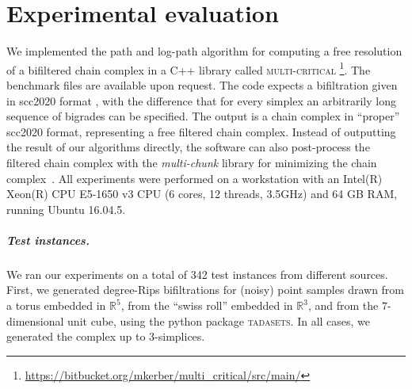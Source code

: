 \documentclass[11pt]{article}
\newcommand{\ignore}[1]{}
\newcommand{\R}{\mathbb{R}}
\begin{document}
\section{Experimental evaluation}
\label{sec:experiments}
%
We implemented the path and log-path algorithm for computing a free resolution
of a bifiltered chain complex 
in a C++ library called \textsc{multi-critical} \footnote{\url{https://bitbucket.org/mkerber/multi_critical/src/main/}}. The benchmark files are available upon request.  
The code expects a bifiltration given in
scc2020 format \cite{scc2020}%
, with the difference that for every simplex an arbitrarily long
sequence of bigrades can be specified.
The output is a chain complex in ``proper''
scc2020 format, representing a free filtered chain complex.
Instead
of outputting the result of our algorithms directly, the software can also
post-process the filtered chain complex with the \emph{multi-chunk} \cite{multi_chunk}
library for minimizing the chain complex~\cite{fk-chunk,fkr-compression}. 
%
All experiments were performed on a workstation with an Intel(R) Xeon(R) CPU E5-1650 v3 CPU (6 cores, 12 threads, 3.5GHz) and 64 GB RAM, running Ubuntu 16.04.5.
%
\subparagraph{Test instances.}
%
We ran our experiments on a total of 342 test instances from different
sources.
First, we generated degree-Rips bifiltrations
for (noisy) point samples drawn from a torus
embedded in $\R^5$, from the ``swiss roll'' embedded in $\R^3$,
and from the $7$-dimensional unit cube, using the python package \textsc{tadasets}.
In all cases, we generated the complex up to $3$-simplices.
\ignore{
We also included \emph{compressed} degree-Rips bifiltrations in our experiments
which are currently researched in a parallel project~\cite{anonymous}.
The idea of the approach is that generators of $0$- and $1$-simplices
in the deg-Rips complex can be simplified (i.e., their criticality is reduced)
without changing the homology of the complex. This allowed us to consider instances with more
points; however, since the results were qualitatively similar to the full degree-Rips case,
we do not give details outcomes on the compressed instances in present paper.
}
\end{document}
